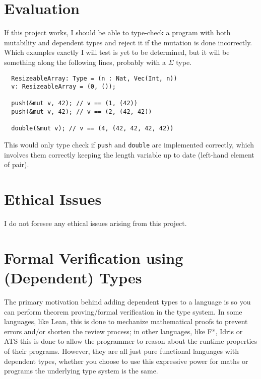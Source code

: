 \documentclass[12pt,twoside]{report}
\begin{document}
\chapter{Evaluation}
If this project works, I should be able to type-check a program with both mutability and dependent types and reject it if the mutation is done incorrectly. Which examples exactly I will test is yet to be determined, but it will be something along the following lines, probably with a $\Sigma$ type.

\begin{lstlisting}
  ResizeableArray: Type = (n : Nat, Vec(Int, n))
  v: ResizeableArray = (0, ());

  push(&mut v, 42); // v == (1, (42))
  push(&mut v, 42); // v == (2, (42, 42))

  double(&mut v); // v == (4, (42, 42, 42, 42))
\end{lstlisting}

This would only type check if \verb|push| and \verb|double| are implemented correctly, which involves them correctly keeping the length variable up to date (left-hand element of pair).

\chapter{Ethical Issues}
I do not foresee any ethical issues arising from this project.




\appendix 
{}

\chapter{Formal Verification using (Dependent) Types}
\label{verificationwithtypes}

The primary motivation behind adding dependent types to a language is so you can perform theorem proving/formal verification in the type system. In some languages, like Lean, this is done to mechanize mathematical proofs to prevent errors and/or shorten the review process; in other languages, like F*, Idris or ATS this is done to allow the programmer to reason about the runtime properties of their programs. However, they are all just pure functional languages with dependent types, whether you choose to use this expressive power for maths or programs the underlying type system is the same.
\end{document}
